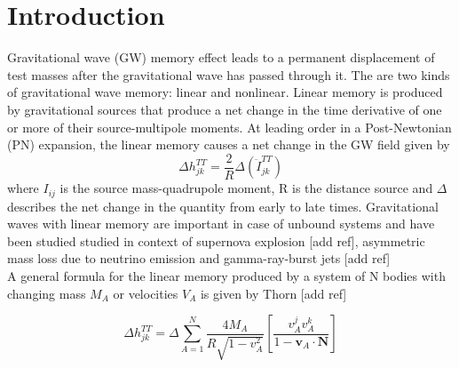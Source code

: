 \documentclass[prd,preprintnumbers,twocolumn,eqsecnum,floatfix,letter]{revtex4}
\begin{document}
\maketitle

\section{Introduction}

Gravitational wave (GW) memory effect leads to a permanent displacement of test masses after the gravitational wave has passed through it. The are two kinds of gravitational wave memory: linear and nonlinear. Linear memory is produced by gravitational sources that produce a net change in the time derivative of one or more of their source-multipole moments. At leading order in a Post-Newtonian (PN) expansion, the linear memory causes a net change in the GW field given by
\begin{equation}
	\Delta h^{TT}_{jk} = \frac{2}{R}\Delta\left(\ddot{\mathit{I}}^{TT}_{jk}\right) 
\end{equation} 
where $I_{ij}$ is the source mass-quadrupole moment, R is the distance source and $\Delta$ describes the net change in the quantity from early to late times. Gravitational waves with linear memory are important in case of unbound systems and have been studied studied in context of supernova explosion [add ref], asymmetric mass loss due to neutrino emission and gamma-ray-burst jets [add ref] \\

A general formula for the linear memory produced by a system of N bodies with changing mass $M_A$ or velocities $V_A$ is given by Thorn [add ref]

\begin{equation}
\Delta h^{TT}_{jk} = \Delta \sum_{A=1}^{N}\frac{4 M_A}{R\sqrt{1-v^2_A}}\left[\frac{v^j_A v^k_A}{1-\boldsymbol{v}_A\cdot \boldsymbol{N}}\right]
\end{equation} 
\end{document}
